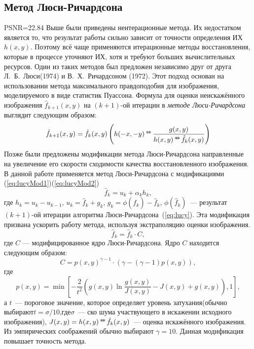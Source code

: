 \subsection{Метод Люси-Ричардсона}
PSNR=22.84
Выше были приведены неитерационные метода. Их недостатком является то, что результат работы сильно зависит от точности определения ИХ $h(x,y)$. Поэтому всё чаще применяются итерационные методы восстановления, которые в процессе уточняют ИХ, хотя и требуют больших вычислительных ресурсов. Один из таких методов был предложен независимо друг от друга Л.~Б.~Люси(1974)\cite{lucy} и В.~Х.~Ричардсоном (1972)\cite{richardson}. Этот подход основан на использовании метода максимального правдоподобия для изображения, моделируемого в виде статистик Пуассона. Формула для оценки неискажённого изображения $\hat{f}_{k+1}(x,y)$ на $(k + 1)$-ой итерации в \textit{методе Люси-Ричардсона} выглядит следующим образом:
\begin{equation}\label{eq:lucy}
	\hat{f}_{k+1}(x,y) = \hat{f}_k(x,y) \left(h(-x,-y) \operatorname*{*\!*} \frac{g(x,y)}{h(x,y) \operatorname*{*\!*} \hat{f}_k(x,y)}\right)
\end{equation}
Позже были предложены модификации метода Люси-Ричардсона \cite{richardsonLucyModifiedBiggs} направленные на увеличение его скорости сходимости качества восстановленного изображения. В данной работе применяется метод Люси-Ричардсона с модификациями (\ref{eq:lucyMod1})(\ref{eq:lucyMod2})
\begin{equation}\label{eq:lucyMod1}
	\hat{f}_k=u_k+\alpha_k h_k,
\end{equation}
где $h_k = u_k - u_{k-1}$, $u_k = \hat{f}_k + g_k$, $g_k = \phi(\hat{f}_k)-\hat{f}_k$, $\phi(\hat{f}_k)$~--- результат $(k+1)$-ой итерации алгоритма Люси-Ричардсона~(\ref{eq:lucy}). Эта модификация призвана ускорить работу метода, используя экстраполяцию оценки изображения.   
\begin{equation}\label{eq:lucyMod2}
	\hat{f}_k=\hat{f}_k \cdot C,
\end{equation}
где $C$ — модифицированное ядро Люси-Ричардсона. Ядро $C$ находится следующим образом:
\begin{equation}
	C = p(x,y)^{\gamma-1}\cdot (\gamma-(\gamma-1)p(x,y)),
\end{equation}
где
\begin{equation}
	p(x,y) = \min\left[
		-\frac{2}{t^2}\left(
			g(x,y)\ln\frac{g(x,y)}{J(x,y)}-J(x,y)+g(x,y)
		\right), 1
	\right],
\end{equation}
а $t$~--- пороговое значение, которое определяет уровень затухания(обычно выбирают$t=\sigma/10$,где$\sigma$~--- ско шума участвующего в искажении исходного изображения), $J(x,y) =h(x,y) \operatorname*{*\!*} \hat{f}_k(x,y)$~--- оценка искажённого изображения. Из эмпирических соображений обычно выбирают $\gamma=10$. Данная модификация повышает точность метода. 

